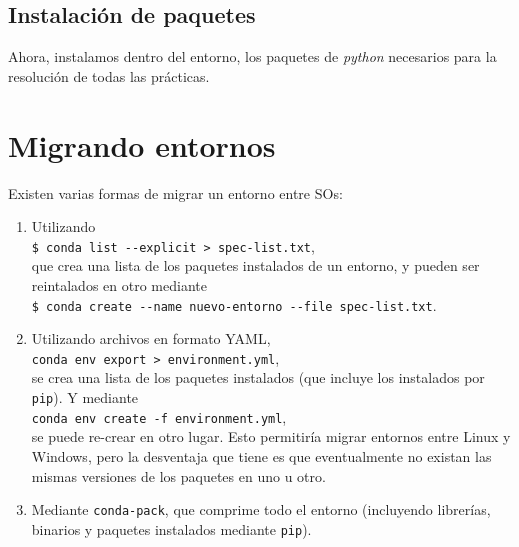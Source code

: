 \documentclass[a4paper, 12pt]{article}
\begin{document}
\subsection{Instalación de paquetes}
Ahora, instalamos dentro del entorno, los paquetes de {\it python} necesarios para la resolución de todas las prácticas.

\begin{tcolorbox}
\end{tcolorbox}


\section{Migrando entornos}
Existen varias formas de migrar un entorno entre SOs: 

\begin{enumerate}
    \item Utilizando\\
    \verb|$ conda list --explicit > spec-list.txt|,\\
    que crea una lista de los paquetes instalados de un entorno, y pueden ser reintalados en otro mediante\\ \verb|$ conda create --name nuevo-entorno --file spec-list.txt|.
    
    \item Utilizando archivos en formato YAML,\\
    \verb|conda env export > environment.yml|,\\ se crea una lista de los paquetes instalados (que incluye los instalados por \verb|pip|). Y mediante\\
    \verb|conda env create -f environment.yml|,\\
    se puede re-crear en otro lugar. Esto permitiría
    migrar entornos entre Linux y Windows, pero la desventaja que tiene es que eventualmente no existan las mismas versiones de los paquetes en uno u otro.
    
    \item Mediante \verb|conda-pack|, que comprime todo el entorno (incluyendo librerías, binarios y paquetes instalados mediante \verb|pip|).
    \end{enumerate}
\end{document}
